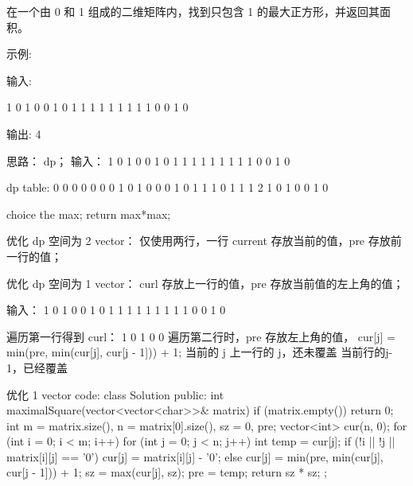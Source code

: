 在一个由 0 和 1 组成的二维矩阵内，找到只包含 1 的最大正方形，并返回其面积。

示例:

输入: 

1 0 1 0 0
1 0 1 1 1
1 1 1 1 1
1 0 0 1 0

输出: 4
























思路：
dp；
输入：
			1 0 1 0 0
			1 0 1 1 1
			1 1 1 1 1
			1 0 0 1 0

dp table: 	   0 0 0 0 0 0
		   0 1 0 1 0 0
		   0 1 0 1 1 1
		   0 1 1 1 2 1
		   0 1 0 0 1 0

choice the max; return max*max;




优化 dp 空间为 2 vector：
仅使用两行，一行 current 存放当前的值，pre 存放前一行的值；




优化 dp 空间为 1 vector：
curl 存放上一行的值，pre 存放当前值的左上角的值；

输入：
			1 0 1 0 0
			1 0 1 1 1
			1 1 1 1 1
			1 0 0 1 0

遍历第一行得到 curl： 1 0 1 0 0
遍历第二行时，pre 存放左上角的值，
 cur[j]  =  min(pre, min(cur[j],             cur[j - 1]))       + 1;
当前的 j           上一行的 j，还未覆盖   当前行的j-1，已经覆盖








优化 1 vector code:
class Solution {
public:
    int maximalSquare(vector<vector<char>>& matrix) {
        if (matrix.empty()) {
            return 0;
        }
        int m = matrix.size(), n = matrix[0].size(), sz = 0, pre;
        vector<int> cur(n, 0);
        for (int i = 0; i < m; i++) {
            for (int j = 0; j < n; j++) {
                int temp = cur[j];
                if (!i || !j || matrix[i][j] == '0') {
                    cur[j] = matrix[i][j] - '0';
                } else {
                    cur[j] = min(pre, min(cur[j], cur[j - 1])) + 1;
                }
                sz = max(cur[j], sz);
                pre = temp;
            }
        }
        return sz * sz;
    }
};







